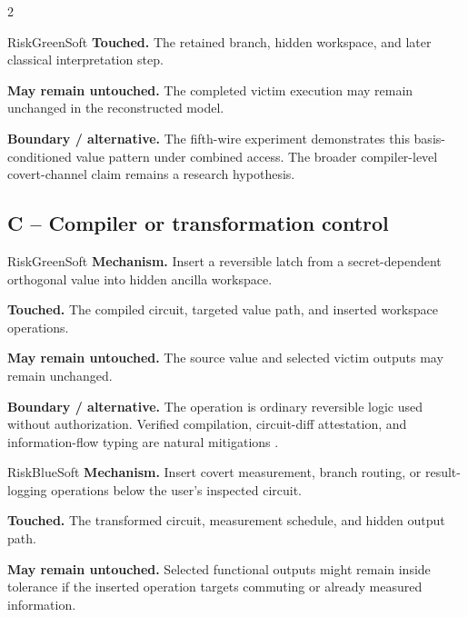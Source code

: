 \begin{multicols}{2}
\begin{matrixrecord}{RiskGreenSoft}
\textbf{Touched.} The retained branch, hidden workspace, and later classical interpretation step.

\textbf{May remain untouched.} The completed victim execution may remain unchanged in the reconstructed model.

\textbf{Boundary / alternative.} The fifth-wire experiment demonstrates this basis-conditioned value pattern under combined access. The broader compiler-level covert-channel claim remains a research hypothesis.

\hfill\matrixback
\end{matrixrecord}

\columnbreak
\subsection*{C -- Compiler or transformation control}
\hypertarget{cell:C1}{}
\begin{matrixrecord}{RiskGreenSoft}
\textbf{Mechanism.} Insert a reversible latch from a secret-dependent orthogonal value into hidden ancilla workspace.

\textbf{Touched.} The compiled circuit, targeted value path, and inserted workspace operations.

\textbf{May remain untouched.} The source value and selected victim outputs may remain unchanged.

\textbf{Boundary / alternative.} The operation is ordinary reversible logic used without authorization. Verified compilation, circuit-diff attestation, and information-flow typing are natural mitigations \cite{rand2019reqwire,john2025trojan}.

\hfill\matrixback
\end{matrixrecord}

\hypertarget{cell:C2}{}
\begin{matrixrecord}{RiskBlueSoft}
\textbf{Mechanism.} Insert covert measurement, branch routing, or result-logging operations below the user's inspected circuit.

\textbf{Touched.} The transformed circuit, measurement schedule, and hidden output path.

\textbf{May remain untouched.} Selected functional outputs might remain inside tolerance if the inserted operation targets commuting or already measured information.


\end{matrixrecord}
\end{multicols}
